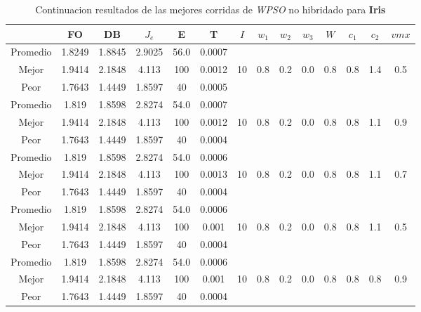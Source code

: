 \begin{table}[h!]
    \footnotesize
    \begin{center}
        \begin{tabular}{|c|c|c|c|c|c|c|c|c|c|c|c|c|c|}
        \hline
            & {\bf FO} & {\bf DB} & $J_e$ & {\bf E} & {\bf T} & $I$ & $w_1$ & $w_2$ & $w_3$ & $W$ & $c_1$ & $c_2$ & $vmx$ \\
        \hline
        \hline
            Promedio  & 1.8249 & 1.8845 & 2.9025 & 56.0 & 0.0007 &  &  &  &  &  &  &  & \\
            \cline{1-6}
            Mejor & 1.9414 & 2.1848  & 4.113 & 100 & 0.0012 & 10 & 0.8 & 0.2 & 0.0 & 0.8 & 0.8 & 1.4 & 0.5\\
            \cline{1-6}
            Peor & 1.7643 & 1.4449  & 1.8597 & 40 & 0.0005 &  &  &  &  &  &  &  & \\
        \hline
        \hline
            Promedio  & 1.819 & 1.8598 & 2.8274 & 54.0 & 0.0007 &  &  &  &  &  &  &  & \\
            \cline{1-6}
            Mejor & 1.9414 & 2.1848  & 4.113 & 100 & 0.0012 & 10 & 0.8 & 0.2 & 0.0 & 0.8 & 0.8 & 1.1 & 0.9\\
            \cline{1-6}
            Peor & 1.7643 & 1.4449  & 1.8597 & 40 & 0.0004 &  &  &  &  &  &  &  & \\
        \hline
        \hline
            Promedio  & 1.819 & 1.8598 & 2.8274 & 54.0 & 0.0006 &  &  &  &  &  &  &  & \\
            \cline{1-6}
            Mejor & 1.9414 & 2.1848  & 4.113 & 100 & 0.0013 & 10 & 0.8 & 0.2 & 0.0 & 0.8 & 0.8 & 1.1 & 0.7\\
            \cline{1-6}
            Peor & 1.7643 & 1.4449  & 1.8597 & 40 & 0.0004 &  &  &  &  &  &  &  & \\
        \hline
        \hline
            Promedio  & 1.819 & 1.8598 & 2.8274 & 54.0 & 0.0006 &  &  &  &  &  &  &  & \\
            \cline{1-6}
            Mejor & 1.9414 & 2.1848  & 4.113 & 100 & 0.001 & 10 & 0.8 & 0.2 & 0.0 & 0.8 & 0.8 & 1.1 & 0.5\\
            \cline{1-6}
            Peor & 1.7643 & 1.4449  & 1.8597 & 40 & 0.0004 &  &  &  &  &  &  &  & \\
        \hline
        \hline
            Promedio  & 1.819 & 1.8598 & 2.8274 & 54.0 & 0.0006 &  &  &  &  &  &  &  & \\
            \cline{1-6}
            Mejor & 1.9414 & 2.1848  & 4.113 & 100 & 0.001 & 10 & 0.8 & 0.2 & 0.0 & 0.8 & 0.8 & 0.8 & 0.9\\
            \cline{1-6}
            Peor & 1.7643 & 1.4449  & 1.8597 & 40 & 0.0004 &  &  &  &  &  &  &  & \\
        \hline
        \end{tabular}
        \caption{Continuacion resultados de las mejores corridas de \emph{WPSO} no hibridado para {\bf Iris}}
        \label{tb:tablewpsoalgcsvc}
    \end{center}
\end{table}

